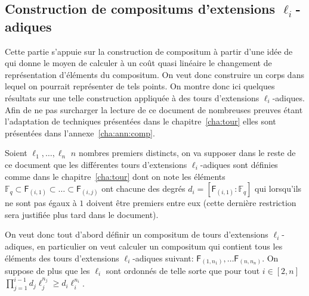 \documentclass[10pt,a4paper]{book}
\theoremstyle{plain}
\theoremstyle{definition}
\theoremstyle{definition}
\theoremstyle{definition}
\theoremstyle{definition}
\theoremstyle{remark}
\theoremstyle{remark}
\theoremstyle{definition}
\begin{document}
\subsection{Construction de compositums d'extensions $\ell_i$-adiques}
\label{sub:con:com}

Cette partie s'appuie sur la construction de compositum à partir d'une idée de
\cite{DeFeoDoliskaniSchost14} qui donne le moyen de calculer à un coût quasi 
linéaire le changement de représentation d'éléments du compositum. On veut donc
construire un corps dans lequel on pourrait représenter de tels points. On 
montre donc ici quelques résultats sur une telle construction appliquée à des 
tours d'extensions $\ell_i$-adiques. Afin de ne pas surcharger la lecture de ce 
document de nombreuses preuves étant l'adaptation de techniques présentées 
dans le chapitre~\ref{cha:tour} elles sont présentées dans 
l'annexe~\ref{cha:ann:comp}.

Soient $\ell_1, \dots, \ell_n$ $n$ nombres premiers distincts, 
on va supposer dans le reste de ce document que les différentes tours 
d'extensions $\ell_i$-adiques sont définies comme dans le 
chapitre~\ref{cha:tour} dont on note les éléments 
$\mathbb{F}_q \subset \mathsf{F}_{(i,1)} \subset \dots \subset  \mathsf{F}_{(i,j)}$ 
ont chacune des degrés $d_i=[\mathsf{F}_{(i,1)}:\mathbb{F}_q]$ qui lorsqu'ils 
ne sont pas égaux à $1$ doivent être premiers entre eux (cette dernière 
restriction sera justifiée plus tard dans le document).

On veut donc tout d'abord définir un compositum de tours d'extensions 
$\ell_i$-adiques, en particulier on veut calculer un compositum qui contient 
tous les éléments des tours d'extensions $\ell_i$-adiques suivant:
$\mathsf{F}_{(1,n_1)}, \dots \mathsf{F}_{(n,n_n)}$. On suppose de plus que les
$\ell_i$ sont ordonnés de telle sorte que pour tout $i \in [2,n]$ 
$\prod_{j=1}^{i-1}d_j\ell_j^{n_j} \geqslant d_i\ell_i^{n_i}$.
\end{document}
